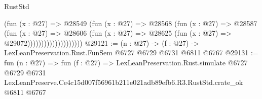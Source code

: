 \begin{lexlean}{RustStd}
\begin{coremodule}
                                (fun (x : @27) =>
                                @28549
                                  (fun (x : @27) =>
                                  @28568
                                    (fun (x : @27) =>
                                    @28587
                                      (fun (x : @27) =>
                                      @28606
                                        (fun (x : @27) =>
                                        @28625 (fun (x : @27) => @29072))))))))))))))))))))
@29121 := (n : @27) -> (f : @27) -> LexLeanPreservation.Rust.FunSem @6727 @6729 @6731 @6811 @6767
@29131 := fun (n : @27) =>
  fun (f : @27) =>
  LexLeanPreservation.Rust.simulate
    @6727
    @6729
    @6731
    LexLeanPreserve.Ce4c15d007f56961b211e021adb89efb6.R3.RustStd.crate_ok
    @6811
    @6767
\end{coremodule}
\end{lexlean}
